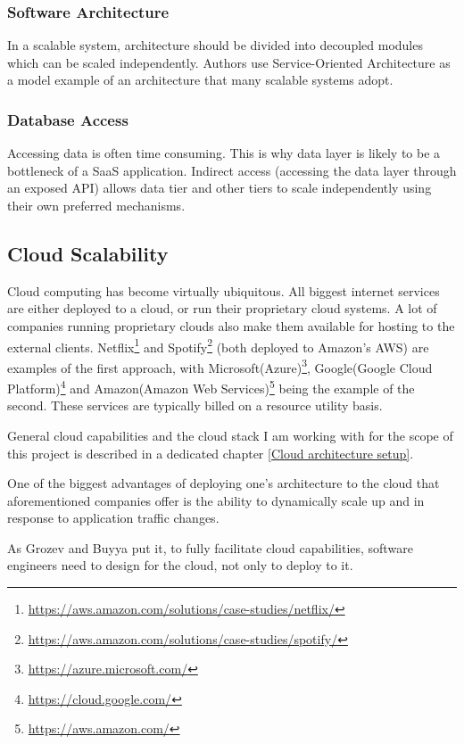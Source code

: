 \documentclass{uvamscse}
\begin{document}
\subsubsection{Software Architecture}
In a scalable system, architecture should be divided into decoupled modules which can be scaled independently. Authors \cite{WeiTek} use Service-Oriented Architecture as a model example of an architecture that many scalable systems adopt.

\subsubsection{Database Access}
Accessing data is often time consuming. This is why data layer is likely to be a bottleneck of a SaaS application. Indirect access (accessing the data layer through an exposed API) allows data tier and other tiers to scale independently using their own preferred mechanisms.

\subsection{Cloud Scalability}\label{Cloud Scalability}
Cloud computing has become virtually ubiquitous. All biggest internet services are either deployed to a cloud, or run their proprietary cloud systems. A lot of companies running proprietary clouds also make them available for hosting to the external clients. Netflix\footnote{\url{https://aws.amazon.com/solutions/case-studies/netflix/}} and Spotify\footnote{\url{https://aws.amazon.com/solutions/case-studies/spotify/}} (both deployed to Amazon's AWS) are examples of the first approach, with Microsoft(Azure)\footnote{\url{https://azure.microsoft.com/}}, Google(Google Cloud Platform)\footnote{\url{https://cloud.google.com/}} and Amazon(Amazon Web Services)\footnote{\url{https://aws.amazon.com/}} being the example of the second. These services are typically billed on a resource utility basis.

General cloud capabilities and the cloud stack I am working with for the scope of this project is described in a dedicated chapter \ref{Cloud architecture setup}.

One of the biggest advantages of deploying one's architecture to the cloud that aforementioned companies offer is the ability to dynamically scale up and in response to application traffic changes.

As Grozev and Buyya \cite{GroBuy} put it, to fully facilitate cloud capabilities, software engineers need to design for the cloud, not only to deploy to it.
\end{document}
